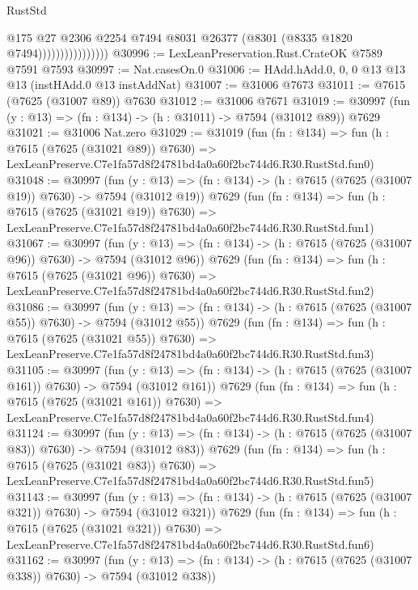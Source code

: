 \begin{lexlean}{RustStd}
\begin{coremodule}
                                @175
                                @27
                                @2306
                                @2254
                                @7494
                                @8031
                                @26377
                                (@8301 (@8335 @1820 @7494))))))))))))))))
@30996 := LexLeanPreservation.Rust.CrateOK @7589 @7591 @7593
@30997 := Nat.casesOn.{0}
@31006 := HAdd.hAdd.{0, 0, 0} @13 @13 @13 (instHAdd.{0} @13 instAddNat)
@31007 := @31006 @7673
@31011 := @7615 (@7625 (@31007 @89)) @7630
@31012 := @31006 @7671
@31019 := @30997 (fun (y : @13) => (fn : @134) -> (h : @31011) -> @7594 (@31012 @89)) @7629
@31021 := @31006 Nat.zero
@31029 := @31019
    (fun (fn : @134) =>
    fun (h : @7615 (@7625 (@31021 @89)) @7630) =>
    LexLeanPreserve.C7e1fa57d8f24781bd4a0a60f2bc744d6.R30.RustStd.fun0)
@31048 := @30997
    (fun (y : @13) => (fn : @134) -> (h : @7615 (@7625 (@31007 @19)) @7630) -> @7594 (@31012 @19))
    @7629
    (fun (fn : @134) =>
    fun (h : @7615 (@7625 (@31021 @19)) @7630) =>
    LexLeanPreserve.C7e1fa57d8f24781bd4a0a60f2bc744d6.R30.RustStd.fun1)
@31067 := @30997
    (fun (y : @13) => (fn : @134) -> (h : @7615 (@7625 (@31007 @96)) @7630) -> @7594 (@31012 @96))
    @7629
    (fun (fn : @134) =>
    fun (h : @7615 (@7625 (@31021 @96)) @7630) =>
    LexLeanPreserve.C7e1fa57d8f24781bd4a0a60f2bc744d6.R30.RustStd.fun2)
@31086 := @30997
    (fun (y : @13) => (fn : @134) -> (h : @7615 (@7625 (@31007 @55)) @7630) -> @7594 (@31012 @55))
    @7629
    (fun (fn : @134) =>
    fun (h : @7615 (@7625 (@31021 @55)) @7630) =>
    LexLeanPreserve.C7e1fa57d8f24781bd4a0a60f2bc744d6.R30.RustStd.fun3)
@31105 := @30997
    (fun (y : @13) => (fn : @134) -> (h : @7615 (@7625 (@31007 @161)) @7630) -> @7594 (@31012 @161))
    @7629
    (fun (fn : @134) =>
    fun (h : @7615 (@7625 (@31021 @161)) @7630) =>
    LexLeanPreserve.C7e1fa57d8f24781bd4a0a60f2bc744d6.R30.RustStd.fun4)
@31124 := @30997
    (fun (y : @13) => (fn : @134) -> (h : @7615 (@7625 (@31007 @83)) @7630) -> @7594 (@31012 @83))
    @7629
    (fun (fn : @134) =>
    fun (h : @7615 (@7625 (@31021 @83)) @7630) =>
    LexLeanPreserve.C7e1fa57d8f24781bd4a0a60f2bc744d6.R30.RustStd.fun5)
@31143 := @30997
    (fun (y : @13) => (fn : @134) -> (h : @7615 (@7625 (@31007 @321)) @7630) -> @7594 (@31012 @321))
    @7629
    (fun (fn : @134) =>
    fun (h : @7615 (@7625 (@31021 @321)) @7630) =>
    LexLeanPreserve.C7e1fa57d8f24781bd4a0a60f2bc744d6.R30.RustStd.fun6)
@31162 := @30997
    (fun (y : @13) => (fn : @134) -> (h : @7615 (@7625 (@31007 @338)) @7630) -> @7594 (@31012 @338))

\end{coremodule}
\end{lexlean}
